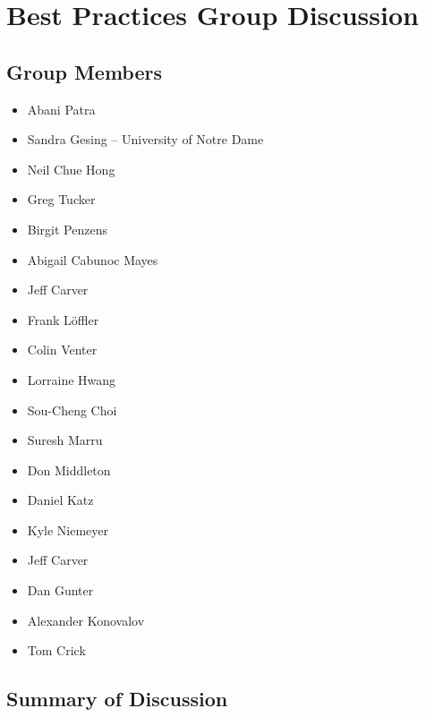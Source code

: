 \section{Best Practices Group Discussion}
\label{sec:appendix_best_practices}


\subsection{Group Members}

\begin{itemize}
\item Abani Patra 
\item Sandra Gesing -- University of Notre Dame
\item Neil Chue Hong 
\item Greg Tucker 
\item Birgit Penzens 
\item Abigail Cabunoc Mayes 
\item Jeff Carver 
\item Frank L\"{o}ffler 
\item Colin Venter 
\item Lorraine Hwang 
\item Sou-Cheng Choi
\item Suresh Marru 
\item Don Middleton 
\item Daniel Katz  
\item Kyle Niemeyer 
\item Jeff Carver 
\item Dan Gunter 
\item Alexander Konovalov 
\item Tom Crick 

\end{itemize}

\subsection{Summary of Discussion}

